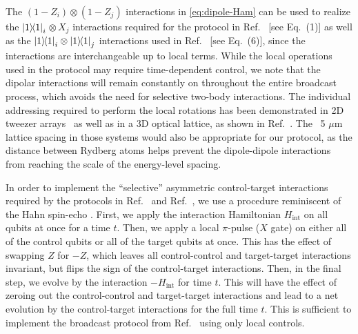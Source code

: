 The $(1-Z_i)\otimes (1-Z_j)$ interactions in \cref{eq:dipole-Ham} can be used to realize the $\ketbra{1}_i$\,$\otimes$\,$X_j$ interactions required for the protocol in Ref.~\cite{Eldredge2017} [see Eq.~(1)] as well as the $\ketbra{1}_i\otimes\ketbra{1}_j$ interactions used in Ref.~\cite{Tran2021b} [see Eq.~(6)], since the interactions are interchangeable up to local terms.
While the local operations used in the protocol may require time-dependent control, we note that the dipolar interactions will remain constantly on throughout the entire broadcast process, which avoids the need for selective two-body interactions.
The individual addressing required to perform the local rotations has been demonstrated in 2D tweezer arrays~\cite{Kaufman2021} as well as in a 3D optical lattice, as shown in Ref.~\cite{Wang2016}.
The ~5 $\mu$m lattice spacing in those systems would also be appropriate for our protocol, as the distance between Rydberg atoms helps prevent the dipole-dipole interactions from reaching the scale of the energy-level spacing.

In order to implement the ``selective'' asymmetric control-target interactions required by the protocols in Ref.~\cite{Eldredge2017} and Ref.~\cite{Tran2021a}, we use a procedure reminiscent of the Hahn spin-echo \cite{Hahn1950}.
First, we apply the interaction Hamiltonian $H_\mathrm{int}$ on all qubits at once for a time $t$.
Then, we apply a local $\pi$-pulse ($X$ gate) on either all of the control qubits or all of the target qubits at once.
This has the effect of swapping $Z$ for $-Z$, which leaves all control-control and target-target interactions invariant, but flips the sign of the control-target interactions.
Then, in the final step, we evolve by the interaction $-H_\mathrm{int}$  for time $t$.
This will have the effect of zeroing out the control-control and target-target interactions and lead to a net evolution by the control-target interactions for the full time $t$.
This is sufficient to implement the broadcast protocol from Ref.~\cite{Eldredge2017} using only local controls.


